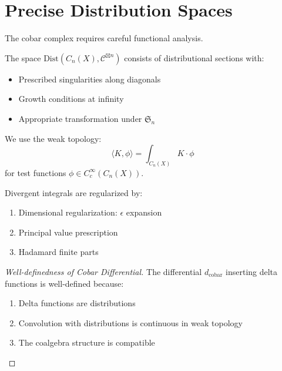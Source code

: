 \section{Precise Distribution Spaces}

The cobar complex requires careful functional analysis.

\begin{definition}
The space $\text{Dist}(C_n(X), \mathcal{C}^{\boxtimes n})$ consists of distributional sections with:
\begin{itemize}
\item Prescribed singularities along diagonals
\item Growth conditions at infinity
\item Appropriate transformation under $\mathfrak{S}_n$
\end{itemize}
\end{definition}

\begin{theorem}[Topology]\label{thm:weak-topology}
We use the weak topology:
$$\langle K, \phi \rangle = \int_{C_n(X)} K \cdot \phi$$
for test functions $\phi \in C_c^\infty(C_n(X))$.
\end{theorem}

\begin{lemma}[Regularization]
Divergent integrals are regularized by:
\begin{enumerate}
\item Dimensional regularization: $\epsilon$ expansion
\item Principal value prescription
\item Hadamard finite parts
\end{enumerate}
\end{lemma}

\begin{proof}[Well-definedness of Cobar Differential]
The differential $d_{\text{cobar}}$ inserting delta functions is well-defined because:
\begin{enumerate}
\item Delta functions are distributions
\item Convolution with distributions is continuous in weak topology
\item The coalgebra structure is compatible
\end{enumerate}
\end{proof}

